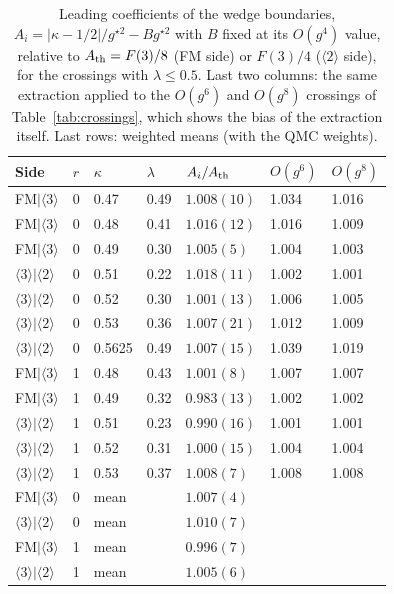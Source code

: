 \documentclass[
 aps,prb,
 twocolumn,
 superscriptaddress,
 longbibliography,
 nofootinbib,
 floatfix
]{revtex4-2}
\begin{document}
\begin{table}
\caption{Leading coefficients of the wedge boundaries, $A_i=|\kappa-1/2|/g^{\star2}-Bg^{\star2}$ with
$B$ fixed at its $O(g^4)$ value, relative to $A_{\rm th}=F(3)/8$ (FM side) or $F(3)/4$ ($\langle2\rangle$
side), for the crossings with $\lambda\le0.5$. Last two columns: the same extraction applied to the $O(g^6)$ and $O(g^8)$ crossings of
Table~\ref{tab:crossings}, which shows the bias of the extraction itself. Last rows:
weighted means (with the QMC weights).}
\label{tab:slopes}
\begin{ruledtabular}
\begin{tabular}{lllllll}
Side & $r$ & $\kappa$ & $\lambda$ & $A_i/A_{\rm th}$ & $O(g^6)$ & $O(g^8)$ \\
\hline
FM$|\langle3\rangle$ & 0 & 0.47 & 0.49 & $1.008(10)$ & 1.034 & 1.016 \\
FM$|\langle3\rangle$ & 0 & 0.48 & 0.41 & $1.016(12)$ & 1.016 & 1.009 \\
FM$|\langle3\rangle$ & 0 & 0.49 & 0.30 & $1.005(5)$ & 1.004 & 1.003 \\
$\langle3\rangle|\langle2\rangle$ & 0 & 0.51 & 0.22 & $1.018(11)$ & 1.002 & 1.001 \\
$\langle3\rangle|\langle2\rangle$ & 0 & 0.52 & 0.30 & $1.001(13)$ & 1.006 & 1.005 \\
$\langle3\rangle|\langle2\rangle$ & 0 & 0.53 & 0.36 & $1.007(21)$ & 1.012 & 1.009 \\
$\langle3\rangle|\langle2\rangle$ & 0 & 0.5625 & 0.49 & $1.007(15)$ & 1.039 & 1.019 \\
FM$|\langle3\rangle$ & 1 & 0.48 & 0.43 & $1.001(8)$ & 1.007 & 1.007 \\
FM$|\langle3\rangle$ & 1 & 0.49 & 0.32 & $0.983(13)$ & 1.002 & 1.002 \\
$\langle3\rangle|\langle2\rangle$ & 1 & 0.51 & 0.23 & $0.990(16)$ & 1.001 & 1.001 \\
$\langle3\rangle|\langle2\rangle$ & 1 & 0.52 & 0.31 & $1.000(15)$ & 1.004 & 1.004 \\
$\langle3\rangle|\langle2\rangle$ & 1 & 0.53 & 0.37 & $1.008(7)$ & 1.008 & 1.008 \\
\hline
FM$|\langle3\rangle$ & 0 & mean & & $1.007(4)$ \\
$\langle3\rangle|\langle2\rangle$ & 0 & mean & & $1.010(7)$ \\
FM$|\langle3\rangle$ & 1 & mean & & $0.996(7)$ \\
$\langle3\rangle|\langle2\rangle$ & 1 & mean & & $1.005(6)$ \\
\end{tabular}
\end{ruledtabular}
\end{table}
\end{document}
